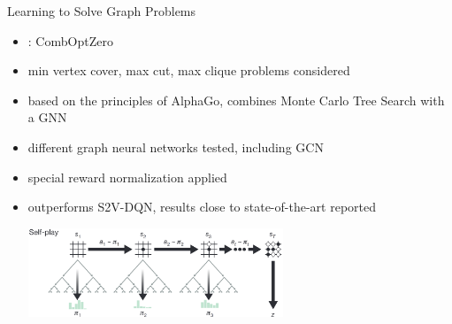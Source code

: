 \documentclass[aspectratio=1610]{beamer}
\newcommand{\important}[1]{{\color{green!60!black}#1}}
\begin{document}
\begin{frame}{Learning to Solve Graph Problems}
	\begin{itemize}
		\itemsep1.1ex
		\item {}: \important{CombOptZero}
		\item min vertex cover, max cut, max clique problems considered
		\item based on the principles of \important{AlphaGo, combines Monte Carlo Tree Search with a GNN}
		\item \important{different graph neural networks} tested, including GCN
		\item special reward normalization applied
		\item outperforms S2V-DQN, results close to state-of-the-art reported
		
		\includegraphics[width=0.6\textwidth]{graphics/alpha-zero-selfplay.png}
		
	\end{itemize}
\end{frame}





\end{document}
